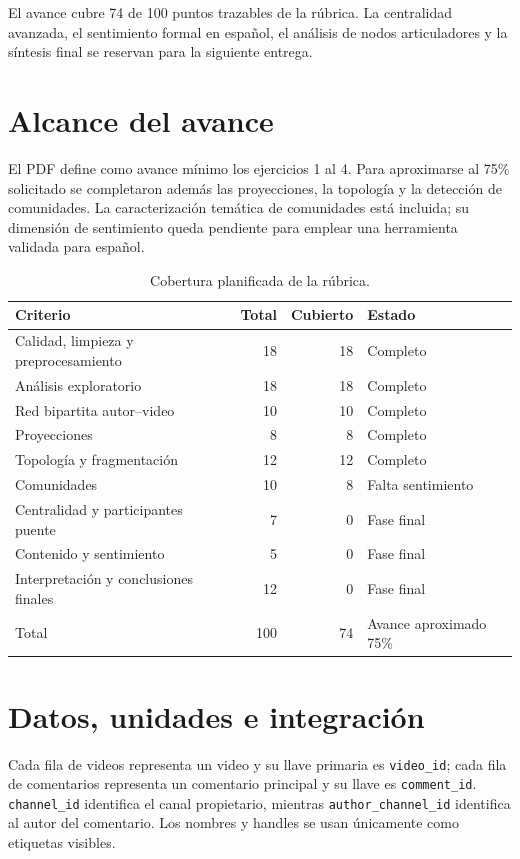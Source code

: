 \documentclass[11pt]{article}
\begin{document}
El avance cubre 74 de 100 puntos trazables de la rúbrica. La centralidad avanzada, el sentimiento formal en español, el análisis de nodos articuladores y la síntesis final se reservan para la siguiente entrega.

\section{Alcance del avance}

El PDF define como avance mínimo los ejercicios 1 al 4. Para aproximarse al 75\% solicitado se completaron además las proyecciones, la topología y la detección de comunidades. La caracterización temática de comunidades está incluida; su dimensión de sentimiento queda pendiente para emplear una herramienta validada para español.

\begin{table}[H]
\centering
\caption{Cobertura planificada de la rúbrica.}
\begin{tabular}{p{}rrl}
\toprule
Criterio & Total & Cubierto & Estado\\
\midrule
Calidad, limpieza y preprocesamiento & 18 & 18 & Completo\\
Análisis exploratorio & 18 & 18 & Completo\\
Red bipartita autor--video & 10 & 10 & Completo\\
Proyecciones & 8 & 8 & Completo\\
Topología y fragmentación & 12 & 12 & Completo\\
Comunidades & 10 & 8 & Falta sentimiento\\
Centralidad y participantes puente & 7 & 0 & Fase final\\
Contenido y sentimiento & 5 & 0 & Fase final\\
Interpretación y conclusiones finales & 12 & 0 & Fase final\\
\midrule
Total & 100 & 74 & Avance aproximado 75\%\\
\bottomrule
\end{tabular}
\end{table}

\section{Datos, unidades e integración}

Cada fila de videos representa un video y su llave primaria es \texttt{video\_id}; cada fila de comentarios representa un comentario principal y su llave es \texttt{comment\_id}. \texttt{channel\_id} identifica el canal propietario, mientras \texttt{author\_channel\_id} identifica al autor del comentario. Los nombres y handles se usan únicamente como etiquetas visibles.
\end{document}
